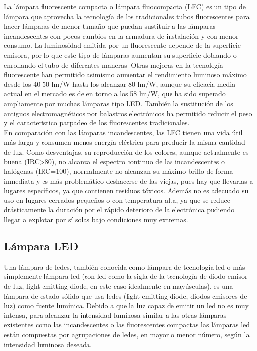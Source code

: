 \documentclass[]{article}
\begin{document}
La lámpara fluorescente compacta o lámpara fluocompacta (LFC) es un tipo de lámpara que aprovecha la tecnología de los tradicionales tubos fluorescentes para hacer lámparas de menor tamaño que puedan sustituir a las lámparas incandescentes con pocos cambios en la armadura de instalación y con menor consumo. La luminosidad emitida por un fluorescente depende de la superficie emisora, por lo que este tipo de lámparas aumentan su superficie doblando o enrollando el tubo de diferentes maneras. Otras mejoras en la tecnología fluorescente han permitido asimismo aumentar el rendimiento luminoso máximo desde los 40-50 lm/W hasta los alcanzar 80 lm/W, aunque su eficacia media actual en el mercado es de en torno a los 58 lm/W, que ha sido superado ampliamente por muchas lámparas tipo LED. También la sustitución de los antiguos electromagnéticos por balastros electrónicos ha permitido reducir el peso y el característico parpadeo de los fluorescentes tradicionales.\cite{LamparaFLuorescente}\\

En comparación con las lámparas incandescentes, las LFC tienen una vida útil más larga y consumen menos energía eléctrica para producir la misma cantidad de luz. Como desventajas, su reproducción de los colores, aunque actualmente es buena (IRC>80), no alcanza el espectro continuo de las incandescentes o halógenas (IRC=100), normalmente no alcanzan su máximo brillo de forma inmediata y es más problemático deshacerse de las viejas, pues hay que llevarlas a lugares específicos, ya que contienen residuos tóxicos. Además no es adecuado su uso en lugares cerrados pequeños o con temperatura alta, ya que se reduce drásticamente la duración por el rápido deterioro de la electrónica pudiendo llegar a explotar por sí solas bajo condiciones muy extremas.\cite{LamparaFLuorescente}\\


\subsection{Lámpara LED}

Una lámpara de ledes, también conocida como lámpara de tecnología led o más simplemente lámpara led (con led como la sigla de la tecnología de diodo emisor de luz, light emitting diode, en este caso idealmente en mayúsculas), es una lámpara de estado sólido que usa ledes (light-emitting diode, diodos emisores de luz) como fuente lumínica. Debido a que la luz capaz de emitir un led no es muy intensa, para alcanzar la intensidad luminosa similar a las otras lámparas existentes como las incandescentes o las fluorescentes compactas las lámparas led están compuestas por agrupaciones de ledes, en mayor o menor número, según la intensidad luminosa deseada.\cite{LamparaLED}
\end{document}
